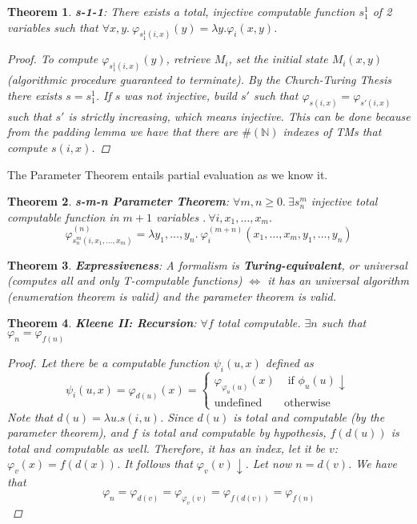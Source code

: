 \documentclass[10pt,landscape]{article}
\newcommand{\conv}{\downarrow}
\newcommand{\N}{\mathbb{N}}
\newcommand{\undef}{\text{undefined}}
\renewcommand{\iff}{\Leftrightarrow}
\theoremstyle{plain}%
\newtheorem*{thm}{Theorem}
\theoremstyle{definition}
\theoremstyle{remark}
\begin{document}
\begin{multicols}{4}

\begin{thm}
    \textbf{s-1-1}: There exists a total, injective computable function $s^1_1$ of 2 
    variables such that $\forall x, y . \ \varphi_{s^1_1(i,x)}(y) = \lambda y . \varphi_i(x,y) $.

    \begin{proof}
        To compute $\varphi_{s^1_1(i,x)}(y)$, retrieve $M_i$, set the initial state $M_i(x,y)$ (algorithmic procedure 
        guaranteed to terminate). By the \textit{Church-Turing Thesis} there exists $s = s^1_1$.
        If $s$ was not injective, build $s'$ such that $\varphi_{s(i,x)} = \varphi_{s'(i,x)}$ such 
        that $s'$ is strictly increasing, which means injective. This can be done because from the padding lemma
        we have that there are $\#(\N)$ indexes of TMs that compute $s(i,x)$.
    \end{proof}
\end{thm}

The Parameter Theorem entails partial evaluation as we know it.


\begin{thm}
    \textbf{s-m-n Parameter Theorem}: $\forall m,n \geq 0 . \ \exists s^m_n$ injective total computable function
    in $m+1$ variables $. \ \forall i, x_1, \hdots, x_m . $
    \[\varphi^{(n)}_{s^m_n(i, x_1, \hdots, x_m)} = \lambda y_1, \hdots, y_n . \ \varphi^{(m+n)}_i (x_1, \hdots, x_m, y_1, \hdots, y_n)\]
\end{thm}


\begin{thm}
    \textbf{Expressiveness}: A formalism is \textbf{Turing-equivalent}, or universal (computes all and only T-computable functions) $\iff$
    it has an universal algorithm (enumeration theorem is valid) and the parameter theorem is valid.
\end{thm}


\begin{thm}
    \textbf{Kleene II: Recursion}: $\forall f$ total computable. $\exists n$ such that $\varphi_n = \varphi_{f(n)}$


    \begin{proof}
        Let there be a computable function $\psi_i(u, x)$ defined as 
        \[\psi_i(u,x) = \varphi_{d(u)}(x) = \begin{cases}
            \varphi_{\varphi_u(u)}(x) & \text{ if } \phi_u(u)\conv \\ 
            \undef & \text{otherwise}
        \end{cases} \]
        Note that $d(u) = \lambda u . s(i,u) $. Since $d(u)$ is 
        total and computable (by the \textit{parameter theorem}), and $f$
        is total and computable by hypothesis, $f(d(u))$ is total and computable 
        as well. Therefore, it has an index, let it be $v$: $\varphi_v(x) = f(d(x))$.
        It follows that $\varphi_v(v) \conv$.
        Let now $n = d(v)$. We have that
        \[\varphi_n = \varphi_{d(v)} = \varphi_{\varphi_v(v)} = \varphi_{f(d(v))} = \varphi_{f(n)} \]


\end{proof}
\end{thm}
\end{multicols}
\end{document}
